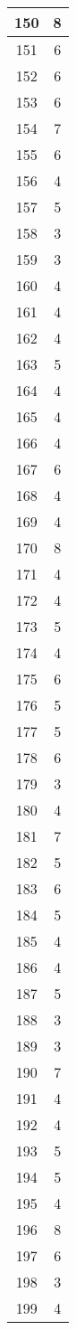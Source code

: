 \documentclass[letterpaper, 12pt]{article}
\begin{document}
\begin{longtable}{|c|c|}
\hline
150 & 8 \\
\hline
151 & 6 \\
\hline
152 & 6 \\
\hline
153 & 6 \\
\hline
154 & 7 \\
\hline
155 & 6 \\
\hline
156 & 4 \\
\hline
157 & 5 \\
\hline
158 & 3 \\
\hline
159 & 3 \\
\hline
160 & 4 \\
\hline
161 & 4 \\
\hline
162 & 4 \\
\hline
163 & 5 \\
\hline
164 & 4 \\
\hline
165 & 4 \\
\hline
166 & 4 \\
\hline
167 & 6 \\
\hline
168 & 4 \\
\hline
169 & 4 \\
\hline
170 & 8 \\
\hline
171 & 4 \\
\hline
172 & 4 \\
\hline
173 & 5 \\
\hline
174 & 4 \\
\hline
175 & 6 \\
\hline
176 & 5 \\
\hline
177 & 5 \\
\hline
178 & 6 \\
\hline
179 & 3 \\
\hline
180 & 4 \\
\hline
181 & 7 \\
\hline
182 & 5 \\
\hline
183 & 6 \\
\hline
184 & 5 \\
\hline
185 & 4 \\
\hline
186 & 4 \\
\hline
187 & 5 \\
\hline
188 & 3 \\
\hline
189 & 3 \\
\hline
190 & 7 \\
\hline
191 & 4 \\
\hline
192 & 4 \\
\hline
193 & 5 \\
\hline
194 & 5 \\
\hline
195 & 4 \\
\hline
196 & 8 \\
\hline
197 & 6 \\
\hline
198 & 3 \\
\hline
199 & 4 \\
\hline
\end{longtable}
\end{document}
